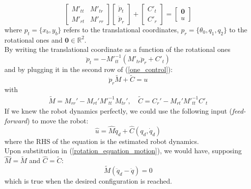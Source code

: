 \documentclass[a4paper,12pt,oneside]{report}
\begin{document}
\begin{equation}
  \begin{bmatrix}
    M'_{tt}&M'_{tr}\\
    M'_{rt}&M'_{rr}
  \end{bmatrix}
  \begin{bmatrix}
    \ddot{p}_t\\
    \ddot{p}_r
  \end{bmatrix}+\begin{bmatrix}
    C'_{t}\\
    C'_{r}
  \end{bmatrix}=\begin{bmatrix}
    \textbf{0}\\
      u
    \end{bmatrix}
    \label{one_control}
\end{equation}
where $p_t=\{x_b,y_b\}$ refers to the translational coordinates, $p_r=\{\theta_0,q_1,q_2\}$ to the rotational ones and $\textbf{0}\in \mathbb{R}^2$.\\
By writing the translational coordinate as a function of the rotational ones
\begin{equation}
  \ddot{p}_t=-{M'}_{tt}^{-1}(M'_{tr}\ddot{p}_r+C'_t)
\end{equation}
and by plugging it in the second row of (\ref{one_control}):
\begin{equation}
  \ddot{p}_r\tilde{M}+\tilde{C}=u
  \label{rotation_equation_motion}
\end{equation}
with
\begin{equation}
\begin{array}{c}
  \tilde{M}=M_{rr}'-M_{rt}'{M'}_{tt}^{-1}M_{tr}', \quad \tilde{C}=C_r'-M_{rt}'{M'}_{tt}^{-1}C'_t
\end{array}
\end{equation}
If we knew the robot dynamics perfectly, we could use the following input (\textit{feed-forward}) to move the robot:
\begin{equation}
  \hat{u}=\hat{M}\ddot{q}_d+\hat{C}(q_d,\dot{q}_d)
\end{equation}
where the RHS of the equation is the estimated robot dynamics.\\
Upon substitution in (\ref{rotation_equation_motion}), we would have, supposing $\hat{M}=\tilde{M}$ and $\hat{C}=\tilde{C}$:
\begin{equation}
  \tilde{M}(\ddot{q}_d-\ddot{q})=0
\end{equation}
which is true when the desired configuration is reached.\\
\end{document}

